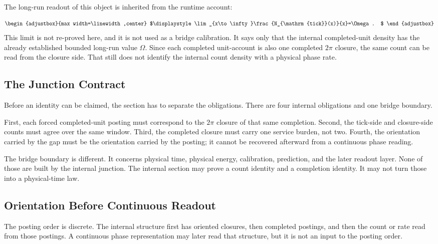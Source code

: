 The long-run readout of this object is inherited from the runtime account:

\begin{equation*}
\begin{adjustbox}{max width=\linewidth,center}
$\displaystyle
\lim_{x\to\infty}\frac{N_{\mathrm{tick}}(x)}{x}=\Omega .
$
\end{adjustbox}
\end{equation*}
This limit is not re-proved here, and it is not used as a bridge calibration. It says only that the internal completed-unit density has the already established bounded long-run value \(\Omega\). Since each completed unit-account is also one completed \(2\pi\) closure, the same count can be read from the closure side. That still does not identify the internal count density with a physical phase rate.

\subsection{The Junction Contract}
Before an identity can be claimed, the section has to separate the obligations. There are four internal obligations and one bridge boundary.

First, each forced completed-unit posting must correspond to the \(2\pi\) closure of that same completion. Second, the tick-side and closure-side counts must agree over the same window. Third, the completed closure must carry one service burden, not two. Fourth, the orientation carried by the gap must be the orientation carried by the posting; it cannot be recovered afterward from a continuous phase reading.

The bridge boundary is different. It concerns physical time, physical energy, calibration, prediction, and the later readout layer. None of those are built by the internal junction. The internal section may prove a count identity and a completion identity. It may not turn those into a physical-time law.

\subsection{Orientation Before Continuous Readout}
The posting order is discrete. The internal structure first has oriented closures, then completed postings, and then the count or rate read from those postings. A continuous phase representation may later read that structure, but it is not an input to the posting order.

